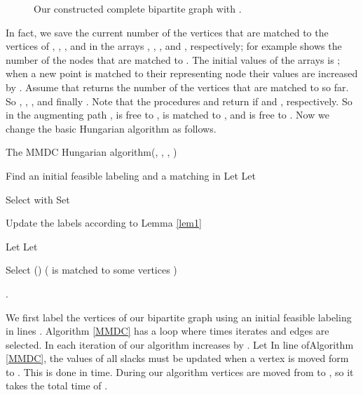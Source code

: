 \documentclass[preprint,12pt]{elsarticle}
\begin{document}
\begin{figure}
\vspace{-8cm}
\hspace{-11cm}
\vspace{-37.5cm}
\caption{Our constructed complete bipartite graph with .}
\label{fig:1}       \end{figure}


In fact, we save the current number of the vertices that are matched to the vertices of , , , and  in the arrays , , , and , respectively; for example  shows the number of the nodes that are matched to . The initial values of the arrays is ; when a new point is matched to their representing node their values are increased by . Assume that  returns the number of the vertices that are matched to  so far. So , , , and finally . Note that the procedures  and  return  if  and , respectively. So in the augmenting path ,  is free to ,  is matched to , and  is free to . Now we change the basic Hungarian algorithm as follows.



\begin{algorithm}
\caption{The MMDC Hungarian algorithm(, , , )}
\label{MMDC}
\begin{algorithmic}[1]

\Initialize \Comment Find an initial feasible labeling  and a matching  in 
\State Let 
\State 
\State 
\State Let  
\item[]
   \While{}

 \State Select  with  
 \State Set 
\item[]
  \Repeat
     \While {}
        \Statex \Comment Update the labels according to Lemma \ref{lem1}

\State Let 
\State Let
 

        \EndWhile
\item[]
         \State Select 
          \If { }\Comment ()
\Statex\Comment ( is matched to some vertices )

            \State .
           \EndIf
          \Until {}   
\item[]
    \State 
    \EndWhile

\end{algorithmic}
\end{algorithm}


We first label the vertices of our bipartite graph  using an initial feasible labeling in lines . Algorithm \ref{MMDC} has a  loop where  times iterates and  edges are selected. In each iteration of our algorithm  increases by . Let  In line  ofAlgorithm \ref{MMDC}, the values of all slacks must be updated when a vertex is moved form  to . This is done in  time. During our algorithm  vertices are moved from  to , so it takes the total time of . 
\end{document}
